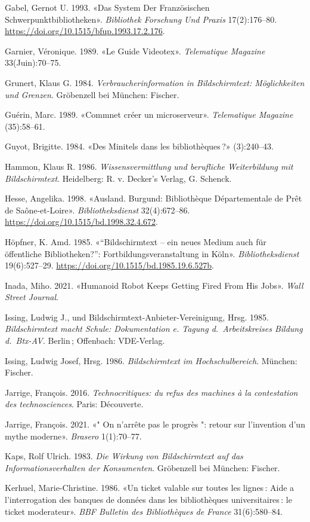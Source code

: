\documentclass[a4paper,
fontsize=11pt,
oneside,
numbers=noperiodatend,
parskip=half-,
bibliography=totoc,
final
]{scrartcl}
\begin{document}
Gabel, Gernot U. 1993. «Das System Der Französischen
Schwerpunktbibliotheken». \emph{Bibliothek Forschung Und Praxis}
17(2):176--80. \url{https://doi.org/10.1515/bfup.1993.17.2.176}.

Garnier, Véronique. 1989. «Le Guide Videotex». \emph{Telematique
Magazine} 33(Juin):70--75.

Grunert, Klaus G. 1984. \emph{Verbraucherinformation in Bildschirmtext:
Möglichkeiten und Grenzen}. Gröbenzell bei München: Fischer.

Guérin, Marc. 1989. «Commnet créer un microserveur». \emph{Telematique
Magazine} (35):58--61.

Guyot, Brigitte. 1984. «Des Minitels dans les bibliothèques\,?»
(3):240--43.

Hammon, Klaus R. 1986. \emph{Wissensvermittlung und berufliche
Weiterbildung mit Bildschirmtext}. Heidelberg: R. v. Decker's Verlag, G.
Schenck.

Hesse, Angelika. 1998. «Ausland. Burgund: Bibliothèque Départementale de
Prêt de Saône-et-Loire». \emph{Bibliotheksdienst} 32(4):672--86.
\url{https://doi.org/10.1515/bd.1998.32.4.672}.

Höpfner, K. Amd. 1985. «\enquote{Bildschirmtext -- ein neues Medium auch
für öffentliche Bibliotheken?}: Fortbildungsveranstaltung in Köln».
\emph{Bibliotheksdienst} 19(6):527--29.
\url{https://doi.org/10.1515/bd.1985.19.6.527b}.

Inada, Miho. 2021. «Humanoid Robot Keeps Getting Fired From His Jobs».
\emph{Wall Street Journal}.

Issing, Ludwig J., und Bildschirmtext-Anbieter-Vereinigung, Hrsg. 1985.
\emph{Bildschirmtext macht Schule: Dokumentation e. Tagung
d.~Arbeitskreises Bildung d.~Btx-AV}. Berlin\,; Offenbach: VDE-Verlag.

Issing, Ludwig Josef, Hrsg. 1986. \emph{Bildschirmtext im
Hochschulbereich}. München: Fischer.

Jarrige, François. 2016. \emph{Technocritiques: du refus des machines à
la contestation des technosciences}. Paris: Découverte.

Jarrige, François. 2021. «" On n'arrête pas le progrès ": retour sur
l'invention d'un mythe moderne». \emph{Brasero} 1(1):70--77.

Kaps, Rolf Ulrich. 1983. \emph{Die Wirkung von Bildschirmtext auf das
Informationsverhalten der Konsumenten}. Gröbenzell bei München: Fischer.

Kerhuel, Marie-Christine. 1986. «Un ticket valable sur toutes les
lignes\,: Aide a l'interrogation des banques de données dans les
bibliothèques universitaires\,: le ticket moderateur». \emph{BBF
Bulletin des Bibliothèques de France} 31(6):580--84.
\end{document}
